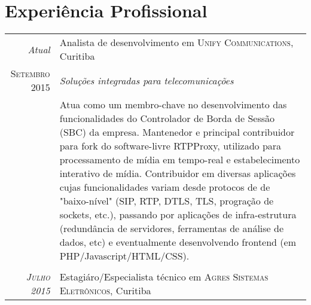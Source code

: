 \documentclass[a4paper,10pt]{article}
\begin{document}
\section{Experiência Profissional}
    \begin{tabular}{r|p{11cm}}
        \emph{Atual}                & Analista de desenvolvimento em \textsc
                                     {Unify Communications},
                                     Curitiba \\

        \textsc{Setembro 2015}       &\emph
                                     {Soluções integradas para telecomunicações} \\
                                     &\footnotesize
                                     {
                                         Atua como um membro-chave no desenvolvimento
                                         das funcionalidades do Controlador de Borda
                                         de Sessão (SBC) da empresa. Mantenedor e
                                         principal contribuidor para fork do
                                         software-livre RTPProxy, utilizado para
                                         processamento de mídia em tempo-real e
                                         estabelecimento interativo de mídia.
                                         Contribuidor em diversas aplicações cujas
                                         funcionalidades variam desde protocos de
                                         de "baixo-nível" (SIP, RTP, DTLS, TLS,
                                         progração de sockets, etc.), passando por
                                         aplicações de infra-estrutura (redundância
                                         de servidores, ferramentas de análise de
                                         dados, etc) e eventualmente desenvolvendo
                                         frontend (em PHP/Javascript/HTML/CSS).
                                     } \\
                                     \multicolumn{2}{c}{} \\

        \emph{\textsc{Julho 2015}}   & Estagiáro/Especialista técnico em \textsc
                                     {Agres Sistemas Eletrônicos},
                                     Curitiba \\


\end{tabular}
\end{document}
